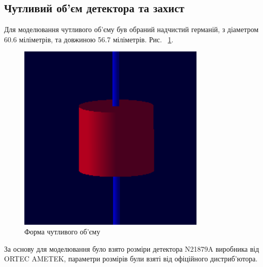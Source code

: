 \documentclass[a4paper, 14pt]{article}
\numberwithin{equation}{section}
\numberwithin{table}{section}
\begin{document}
\subsection{Чутливий об'єм детектора та захист}
Для моделювання чутливого об'єму був обраний надчистий германій, з діаметром 60.6 міліметрів, та довжиною 56.7 міліметрів. Рис. ~\ref{ris:s_detector_volume}.
\begin{figure}[hbt!]
	\centering \includegraphics[width=0.8\textwidth]{images/sDetector158cm3.png}
	\caption{Форма чутливого об'єму} 
	\label{ris:s_detector_volume}	
\end{figure}

За основу для моделювання було взято розміри детектора N21879A виробника від ORTEC AMETEK, параметри розмірів були взяті від офіційного дистриб'ютора.
\end{document}
